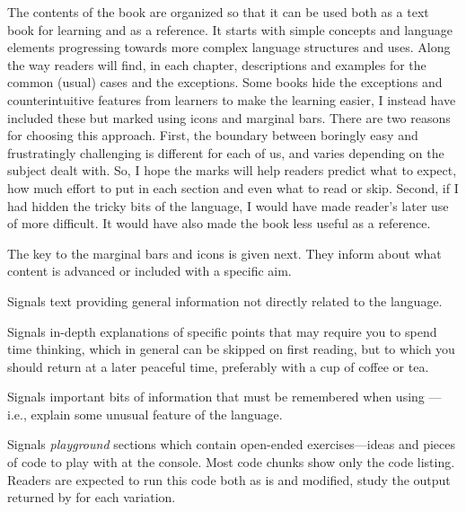\documentclass[krantz2]{krantz}\usepackage{knitr}
\begin{document}
The contents of the book are organized so that it can be used both as a text book for learning \Rlang and as a reference. It starts with simple concepts and language elements progressing towards more complex language structures and uses. Along the way readers will find, in each chapter, descriptions and examples for the common (usual) cases and the exceptions. Some books hide the exceptions and counterintuitive features from learners to make the learning easier, I instead have included these but marked using icons and marginal bars. There are two reasons for choosing this approach. First, the boundary between boringly easy and frustratingly challenging is different for each of us, and varies depending on the subject dealt with. So, I hope the marks will help readers predict what to expect, how much effort to put in each section and even what to read or skip. Second, if I had hidden the tricky bits of the \Rlang language, I would have made reader's later use of \Rlang more difficult. It would have also made the book less useful as a reference.

The key to the marginal bars and icons is given next. They inform about what content is advanced or included with a specific aim.

\begin{infobox}
Signals text providing general information not directly related to the \Rlang language.
\end{infobox}

\begin{explainbox}
Signals in-depth explanations of specific points that may require you to spend time thinking, which in general can be skipped on first reading, but to which you should return at a later peaceful time, preferably with a cup of coffee or tea.
\end{explainbox}

\begin{warningbox}
Signals important bits of information that must be remembered when using \Rlang---i.e., explain some unusual feature of the language.
\end{warningbox}

\begin{playground}
Signals \emph{playground} sections which contain open-ended exercises---ideas and pieces of \Rlang code to play with at the \Rlang console. Most code chunks show only the \Rlang code listing. Readers are expected to run this code both as is and modified, study the output returned by \Rlang for each variation.
\end{playground}
\end{document}
